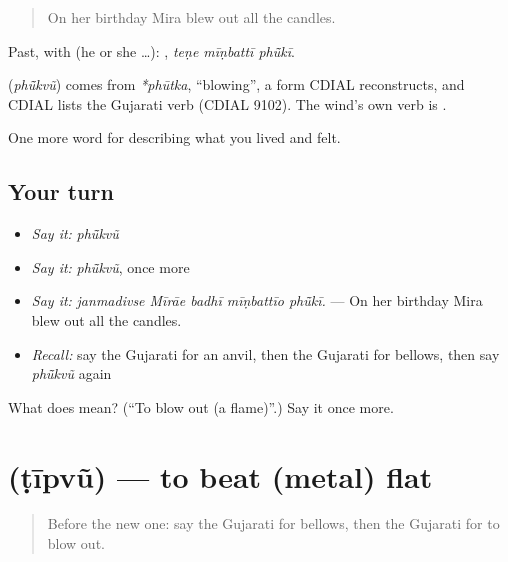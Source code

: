 \begin{quote}
On her birthday Mira blew out all the candles.
\end{quote}

Past, with  (he or she …):   , \emph{teṇe mīṇbattī phū̃kī}.

\begin{cousinweb}
\textbf{} (\emph{phū̃kvũ}) comes from \emph{*phūtka}, \textquotedblleft{}blowing\textquotedblright{}, a form CDIAL reconstructs, and CDIAL lists the Gujarati verb (CDIAL 9102). The wind's own verb is \textbf{}.
\end{cousinweb}

\begin{grammarlens}[title={What you've built}]
One more word for describing what you lived and felt.
\end{grammarlens}

\subsection*{Your turn}
\begin{itemize}
\raggedright
  \item \emph{Say it:} \emph{phū̃kvũ}
  \item \emph{Say it:} \emph{phū̃kvũ}, once more
  \item \emph{Say it:} \emph{janmadivse Mīrāe badhī mīṇbattīo phū̃kī.} — On her birthday Mira blew out all the candles.
  \item \emph{Recall:} say the Gujarati for an anvil, then the Gujarati for bellows, then say \emph{phū̃kvũ} again
\end{itemize}

\begin{tcolorbox}[breakable,colback=teal!4,colframe=teal!35!black,title={Before you move on}]
What does  mean? (\textquotedblleft{}To blow out (a flame)\textquotedblright{}.) Say it once more.
\end{tcolorbox}
\section[\texorpdfstring{\gu{ટીપવું} (ṭīpvũ)}{ટીપવું (ṭīpvũ)}]{ (ṭīpvũ) — to beat (metal) flat}

\label{lesson:GU-C509-tipvu}



\begin{quote}
Before the new one: say the Gujarati for bellows, then the Gujarati for to blow out.
\end{quote}


